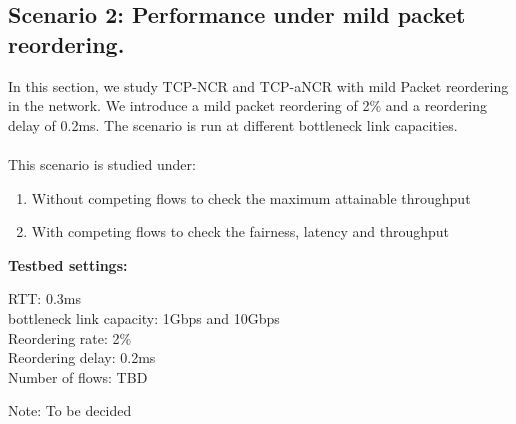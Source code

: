 \subsection{Scenario 2: Performance under mild packet reordering.\label{ss:dc2}}
In this section, we study TCP-NCR and TCP-aNCR with mild Packet reordering in the network. We introduce a mild packet reordering of 2\% and a reordering delay of 0.2ms. The scenario is run at different bottleneck link capacities.
\\
\\
This scenario is studied under:
\begin{enumerate}
    \item Without competing flows to check the maximum attainable throughput
    \item With competing flows to check the fairness, latency and throughput
\end{enumerate}

\textbf{Testbed settings:}
\begin{tabbing}
\quad RTT: 0.3ms \\
\quad bottleneck link capacity: 1Gbps and 10Gbps \\
\quad Reordering rate: 2\% \\
\quad Reordering delay: 0.2ms \\
\quad Number of flows: TBD \\
\end{tabbing}
Note: To be decided\\


